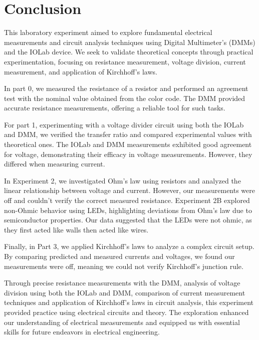 \documentclass[11pt]{article}
\let\oldsection\section
\renewcommand\section{\clearpage\oldsection}
\begin{document}
    \section{Conclusion}\label{sec:conclusion}

    This laboratory experiment aimed to explore fundamental electrical measurements and circuit analysis techniques using Digital Multimeter's (DMMs) and the IOLab device.
    We seek to validate theoretical concepts through practical experimentation, focusing on resistance measurement, voltage division, current measurement, and application of Kirchhoff's laws.

    In part 0, we measured the resistance of a resistor and performed an agreement test with the nominal value obtained from the color code.
    The DMM provided accurate resistance measurements, offering a reliable tool for such tasks.

    For part 1, experimenting with a voltage divider circuit using both the IOLab and DMM, we verified the transfer ratio and compared experimental values with theoretical ones.
    The IOLab and DMM measurements exhibited good agreement for voltage, demonstrating their efficacy in voltage measurements.
    However, they differed when measuring current.

    In Experiment 2, we investigated Ohm's law using resistors and analyzed the linear relationship between voltage and current.
    However, our measurements were off and couldn't verify the correct measured resistance.
    Experiment 2B explored non-Ohmic behavior using LEDs, highlighting deviations from Ohm's law due to semiconductor properties.
    Our data suggested that the LEDs were not ohmic, as they first acted like walls then acted like wires.

    Finally, in Part 3, we applied Kirchhoff's laws to analyze a complex circuit setup.
    By comparing predicted and measured currents and voltages, we found our measurements were off, meaning we could not verify Kirchhoff's junction rule.

    Through precise resistance measurements with the DMM, analysis of voltage division using both the IOLab and DMM, comparison of current measurement techniques and application of Kirchhoff's laws in circuit analysis, this experiment provided practice using electrical circuits and theory.
    The exploration enhanced our understanding of electrical measurements and equipped us with essential skills for future endeavors in electrical engineering.
\end{document}
